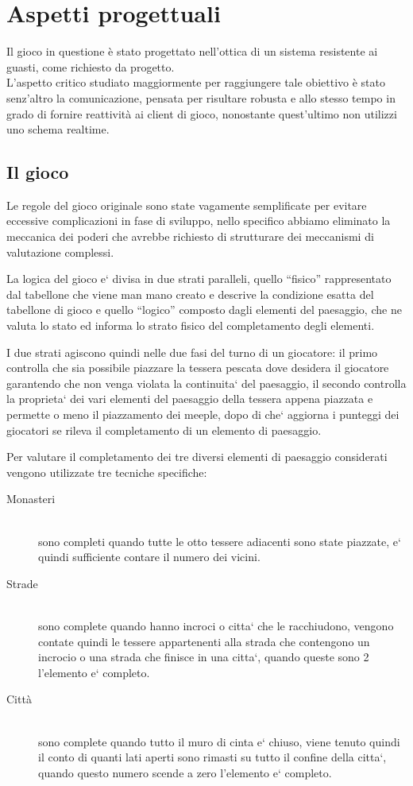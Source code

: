 \section{Aspetti progettuali}
Il gioco in questione è stato progettato nell'ottica di un sistema
resistente ai guasti, come richiesto da progetto.\\
L'aspetto critico studiato maggiormente per raggiungere tale
obiettivo è stato 
senz'altro la comunicazione, pensata per
risultare robusta e allo stesso tempo in grado di fornire reattività ai
client di gioco, nonostante quest'ultimo non utilizzi uno schema
realtime.

\subsection{Il gioco}
Le regole del gioco originale sono state vagamente semplificate per evitare eccessive complicazioni in fase di sviluppo, nello specifico abbiamo eliminato la meccanica dei poderi che avrebbe richiesto di strutturare dei meccanismi di valutazione complessi.

La logica del gioco e` divisa in due strati paralleli, quello ``fisico'' rappresentato dal tabellone che viene man mano creato e descrive la condizione esatta del tabellone di gioco e quello ``logico'' composto dagli elementi del paesaggio, che ne valuta lo stato ed informa lo strato fisico del completamento degli elementi.

I due strati agiscono quindi nelle due fasi del turno di un giocatore: il primo controlla che sia possibile piazzare la tessera pescata dove desidera il giocatore garantendo che non venga violata la continuita` del paesaggio, il secondo controlla la proprieta` dei vari elementi del paesaggio della tessera appena piazzata e permette o meno il piazzamento dei meeple, dopo di che` aggiorna i punteggi dei giocatori se rileva il completamento di un elemento di paesaggio.

Per valutare il completamento dei tre diversi elementi di paesaggio considerati vengono utilizzate tre tecniche specifiche:
\begin{description}
	\item[Monasteri] \hfill \\
		sono completi quando tutte le otto tessere adiacenti sono state piazzate, e` quindi sufficiente contare il numero dei vicini.
	\item[Strade] \hfill \\
		sono complete quando hanno incroci o citta` che le racchiudono, vengono contate quindi le tessere appartenenti alla strada che contengono un incrocio o una strada che finisce in una citta`, quando queste sono 2 l'elemento e` completo.
	\item[Città] \hfill \\
		sono complete quando tutto il muro di cinta e` chiuso, viene tenuto quindi il conto di quanti lati aperti sono rimasti su tutto il confine della citta`, quando questo numero scende a zero l'elemento e` completo.
\end{description}

